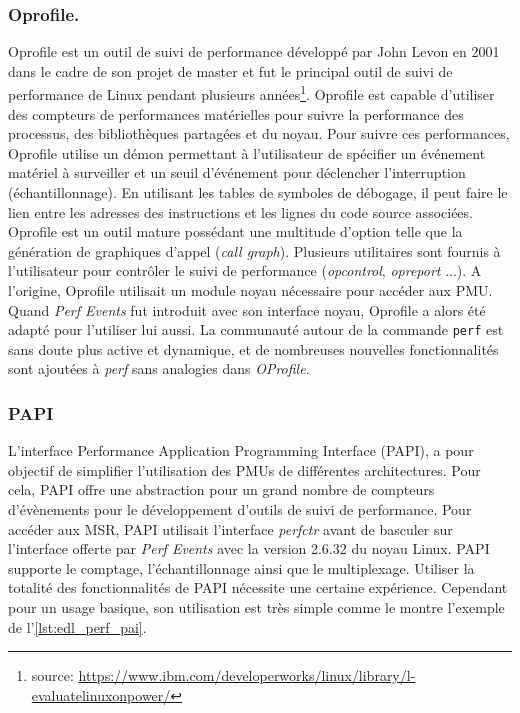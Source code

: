         \subsubsection{Oprofile.} 
            Oprofile \cite{Levon2004} est un outil de suivi de performance développé par John Levon en 2001 dans le cadre de son projet de master et fut le principal outil de suivi de performance de Linux pendant plusieurs années\footnote{source: \url{https://www.ibm.com/developerworks/linux/library/l-evaluatelinuxonpower/}}. 
            Oprofile est capable d'utiliser des compteurs de performances matérielles pour suivre la performance des processus, des bibliothèques partagées et du noyau. Pour suivre ces performances, Oprofile utilise un démon permettant à l'utilisateur de spécifier un événement matériel à surveiller et un seuil d'événement pour déclencher l'interruption (échantillonnage). En utilisant les tables de symboles de débogage, il peut faire le lien entre les adresses des instructions et les lignes du code source associées. Oprofile est un outil mature possédant une multitude d'option telle que la génération de graphiques d'appel (\textit{call graph}). Plusieurs utilitaires sont fournis à l'utilisateur pour contrôler le suivi de performance (\textit{opcontrol}, \textit{opreport} ...).
            A l'origine, Oprofile utilisait un module noyau nécessaire pour accéder aux PMU. Quand \textit{Perf Events} fut introduit avec son interface noyau, Oprofile a alors été adapté pour l'utiliser lui aussi. La communauté autour de la commande \verb|perf| est sans doute plus active et dynamique, et de nombreuses nouvelles fonctionnalités sont ajoutées à \textit{perf} sans analogies dans \textit{OProfile}.
    
        \subsubsection{PAPI}
            L'interface Performance Application Programming Interface (PAPI), a pour objectif de simplifier l'utilisation des PMUs de différentes architectures. Pour cela, PAPI offre une abstraction pour un grand nombre de compteurs d'évènements pour le développement d'outils de suivi de performance. Pour accéder aux MSR, PAPI utilisait l'interface \textit{perfctr} avant de basculer sur l'interface offerte par \textit{Perf Events} avec la version 2.6.32 du noyau Linux. PAPI supporte le comptage, l'échantillonnage ainsi que le multiplexage. Utiliser la totalité des fonctionnalités de PAPI nécessite une certaine expérience. Cependant pour un usage basique, son utilisation est très simple comme le montre l'exemple de l'\autoref{lst:edl_perf_pai}.

